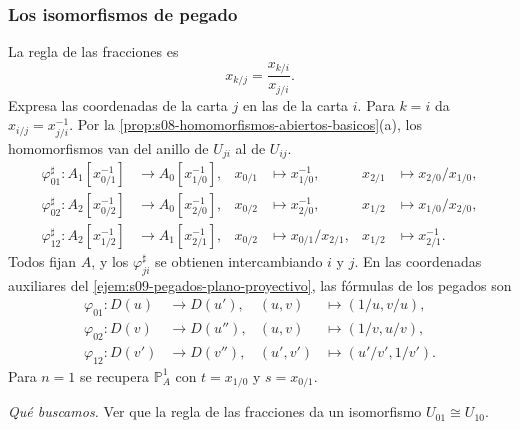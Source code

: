 \subsubsection{Los isomorfismos de pegado}

La regla de las fracciones es
\[
x_{k/j}=\frac{x_{k/i}}{x_{j/i}}.
\]
Expresa las coordenadas de la carta $j$ en las de la carta $i$. Para $k=i$ da $x_{i/j}=x_{j/i}^{-1}$. Por la \cref{prop:s08-homomorfismos-abiertos-basicos}(a), los homomorfismos van del anillo de $U_{ji}$ al de $U_{ij}$.
\[
\begin{aligned}
\varphi_{01}^\sharp\colon A_1[x_{0/1}^{-1}]&\longrightarrow A_0[x_{1/0}^{-1}],
&x_{0/1}&\longmapsto x_{1/0}^{-1},
&x_{2/1}&\longmapsto x_{2/0}/x_{1/0},\\
\varphi_{02}^\sharp\colon A_2[x_{0/2}^{-1}]&\longrightarrow A_0[x_{2/0}^{-1}],
&x_{0/2}&\longmapsto x_{2/0}^{-1},
&x_{1/2}&\longmapsto x_{1/0}/x_{2/0},\\
\varphi_{12}^\sharp\colon A_2[x_{1/2}^{-1}]&\longrightarrow A_1[x_{2/1}^{-1}],
&x_{0/2}&\longmapsto x_{0/1}/x_{2/1},
&x_{1/2}&\longmapsto x_{2/1}^{-1}.
\end{aligned}
\]
Todos fijan $A$, y los $\varphi_{ji}^\sharp$ se obtienen intercambiando $i$ y $j$. En las coordenadas auxiliares del \cref{ejem:s09-pegados-plano-proyectivo}, las fórmulas de los pegados son
\[
\begin{aligned}
\varphi_{01}\colon D(u)&\longrightarrow D(u'), &(u,v)&\longmapsto(1/u,v/u),\\
\varphi_{02}\colon D(v)&\longrightarrow D(u''), &(u,v)&\longmapsto(1/v,u/v),\\
\varphi_{12}\colon D(v')&\longrightarrow D(v''), &(u',v')&\longmapsto(u'/v',1/v').
\end{aligned}
\]
Para $n=1$ se recupera $\mathbb P^1_A$ con $t=x_{1/0}$ y $s=x_{0/1}$.

\emph{Qué buscamos.} Ver que la regla de las fracciones da un isomorfismo $U_{01}\cong U_{10}$.

